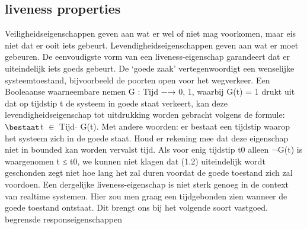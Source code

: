 \documentclass{article}
\begin{document}
	\subsection{liveness properties}
	Veiligheidseigenschappen geven aan wat er wel of niet mag voorkomen,
	maar eis niet dat er ooit iets gebeurt. Levendigheidseigenschappen geven aan wat er moet gebeuren. De eenvoudigste vorm van een liveness-eigenschap garandeert dat er uiteindelijk iets goeds gebeurt. De
	‘goede zaak’ vertegenwoordigt een wenselijke systeemtoestand, bijvoorbeeld de
	poorten open voor het wegverkeer. Een Booleaanse waarneembare nemen
	G : Tijd −→ {0, 1}, waarbij G(t) = 1 drukt uit dat op tijdstip t de
	systeem in goede staat verkeert, kan deze levendigheidseigenschap tot uitdrukking worden gebracht
	volgens de formule:
	$\bestaat$t $\in$ Tijd $\dot{}$ G(t).
	Met andere woorden: er bestaat een tijdstip waarop het systeem zich in de
	goede staat. Houd er rekening mee dat deze eigenschap niet in bounded kan worden vervalst
	tijd. Als voor enig tijdstip t0 alleen ¬G(t) is waargenomen
	t ≤ t0, we kunnen niet klagen dat (1.2) uiteindelijk wordt geschonden
	zegt niet hoe lang het zal duren voordat de goede toestand zich zal voordoen.
	Een dergelijke liveness-eigenschap is niet sterk genoeg in de context van realtime systemen. Hier zou men graag een tijdgebonden zien wanneer de
	goede toestand ontstaat. Dit brengt ons bij het volgende soort vastgoed.
	begrensde responseigenschappen
	
	
	
	
	
	
	
	
	
	
	
	
	
\end{document}
